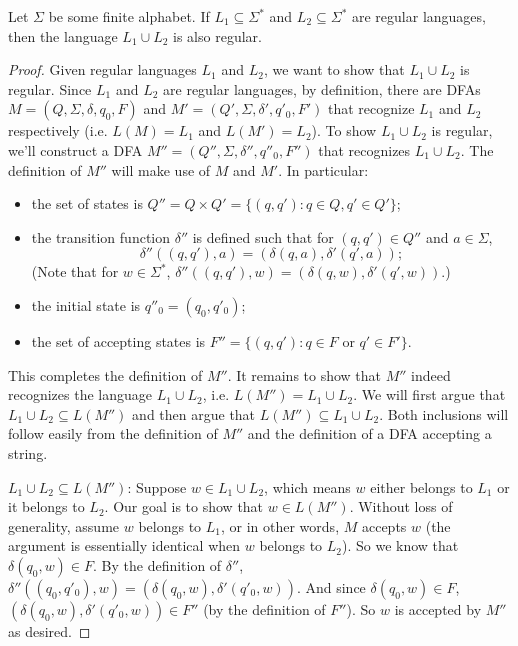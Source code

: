 \begin{flex}
\label{grp:theorem:Regular-languages-are-closed-under-union}

\begin{theorem}
\label{theorem:Regular-languages-are-closed-under-union}
Let $\Sigma$ be some finite alphabet. 
If $L_1 \subseteq \Sigma^*$ and $L_2 \subseteq \Sigma^*$ are regular languages, then the language $L_1 \cup L_2$ is also regular.

\end{theorem}

\begin{proof}
\label{prf:deterministic-finite-automata::given}
Given regular languages $L_1$ and $L_2$, we want to show that $L_1 \cup L_2$ is regular. Since $L_1$ and $L_2$ are regular languages, by definition, there are DFAs $M = (Q, \Sigma, \delta, q_0, F)$ and $M' = (Q', \Sigma, \delta', q'_0, F')$ that recognize $L_1$ and $L_2$ respectively (i.e. $L(M) = L_1$ and $L(M') = L_2$). 
To show $L_1 \cup L_2$ is regular, we'll construct a DFA $M'' = (Q'', \Sigma, \delta'', q''_0, F'')$ that recognizes $L_1 \cup L_2$. 
The definition of $M''$ will make use of $M$ and $M'$. 
In particular:
\begin{itemize}
    \item the set of states is $Q'' = Q \times Q' = \{(q, q') : q \in Q, q' \in Q'\}$;
    \item the transition function $\delta''$ is defined such that for $(q,q') \in Q''$ and $a \in \Sigma$, $$\delta''((q,q'), a) = (\delta(q,a), \delta'(q',a));$$
    (Note that for $w \in \Sigma^*$, $\delta''((q,q'), w) = (\delta(q,w), \delta'(q', w))$.)
    \item the initial state is $q''_0 = (q_0, q'_0)$;
    \item the set of accepting states is $F'' = \{(q, q') : q \in F \text{ or } q' \in F'\}$.
\end{itemize}
This completes the definition of $M''$. 
It remains to show that $M''$ indeed recognizes the language $L_1 \cup L_2$, i.e. $L(M'') = L_1 \cup L_2$. 
We will first argue that $L_1 \cup L_2 \subseteq L(M'')$ and then argue that $L(M'') \subseteq L_1 \cup L_2$. 
Both inclusions will follow easily from the definition of $M''$ and the definition of a DFA accepting a string.

$L_1 \cup L_2 \subseteq L(M'')$: 
Suppose $w \in L_1 \cup L_2$, which means $w$ either belongs to $L_1$ or it belongs to $L_2$. Our goal is to show that $w \in L(M'')$. 
Without loss of generality, assume $w$ belongs to $L_1$, or in other words, $M$ accepts $w$ (the argument is essentially identical when $w$ belongs to $L_2$). 
So we know that $\delta(q_0, w) \in F$. 
By the definition of $\delta''$, $\delta''((q_0, q'_0), w) = (\delta(q_0,w), \delta'(q'_0, w))$. 
And since $\delta(q_0, w) \in F$, $(\delta(q_0,w), \delta'(q'_0, w)) \in F''$ (by the definition of $F''$). 
So $w$ is accepted by $M''$ as desired.


\end{proof}
\end{flex}
